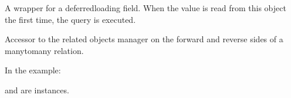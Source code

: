 \documentclass[letterpaper,10pt,french]{sphinxmanual}
\begin{document}
\begin{fulllineitems}
\begin{fulllineitems}
\end{fulllineitems}


\begin{fulllineitems}
\label{\detokenize{main/model:main.models.Ue.niveau}}
\pysigstartsignatures
{}
\pysigstopsignatures
\sphinxAtStartPar
A wrapper for a deferred\sphinxhyphen{}loading field. When the value is read from this
object the first time, the query is executed.

\end{fulllineitems}


\begin{fulllineitems}
\label{\detokenize{main/model:main.models.Ue.objects}}
\pysigstartsignatures
{}
\pysigstopsignatures
\end{fulllineitems}


\begin{fulllineitems}
\label{\detokenize{main/model:main.models.Ue.programme_set}}
\pysigstartsignatures
{}
\pysigstopsignatures
\sphinxAtStartPar
Accessor to the related objects manager on the forward and reverse sides of
a many\sphinxhyphen{}to\sphinxhyphen{}many relation.

\sphinxAtStartPar
In the example:

\begin{sphinxVerbatim}[commandchars=\\\{\}]
 
       
\end{sphinxVerbatim}

\sphinxAtStartPar
{} and  are 
instances.


\end{fulllineitems}
\end{fulllineitems}
\end{document}
